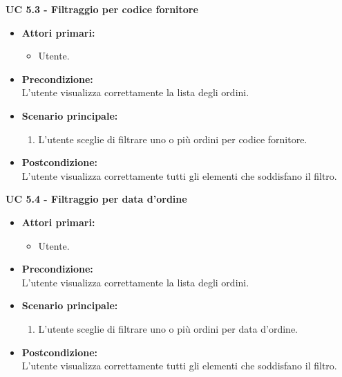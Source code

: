 \vspace{0.4cm}

\noindent \textbf{\large UC 5.3 - Filtraggio per codice fornitore}
\label{uc:filtraggio-codice-fornitore}
\begin{itemize}

	\item \textbf{Attori primari: }
		\begin{itemize}
			\item Utente.
		\end{itemize}

	\item \textbf{Precondizione: }\\[0.3cm]
		L'utente visualizza correttamente la lista degli ordini.

	\item \textbf{Scenario principale: }
		\begin{enumerate}
			\item L'utente sceglie di filtrare uno o più ordini per codice fornitore.
		\end{enumerate}
		

	\item \textbf{Postcondizione: }\\[0.3cm]
		L'utente visualizza correttamente tutti gli elementi che soddisfano il filtro.

\end{itemize}

\vspace{0.4cm}

\noindent \textbf{\large UC 5.4 - Filtraggio per data d'ordine}
\label{uc:filtraggio-data-ordine}
\begin{itemize}

	\item \textbf{Attori primari: }
		\begin{itemize}
			\item Utente.
		\end{itemize}

	\item \textbf{Precondizione: }\\[0.3cm]
		L'utente visualizza correttamente la lista degli ordini.

	\item \textbf{Scenario principale: }
		\begin{enumerate}
			\item L'utente sceglie di filtrare uno o più ordini per data d'ordine.
		\end{enumerate}
		

	\item \textbf{Postcondizione: }\\[0.3cm]
		L'utente visualizza correttamente tutti gli elementi che soddisfano il filtro.

\end{itemize}

